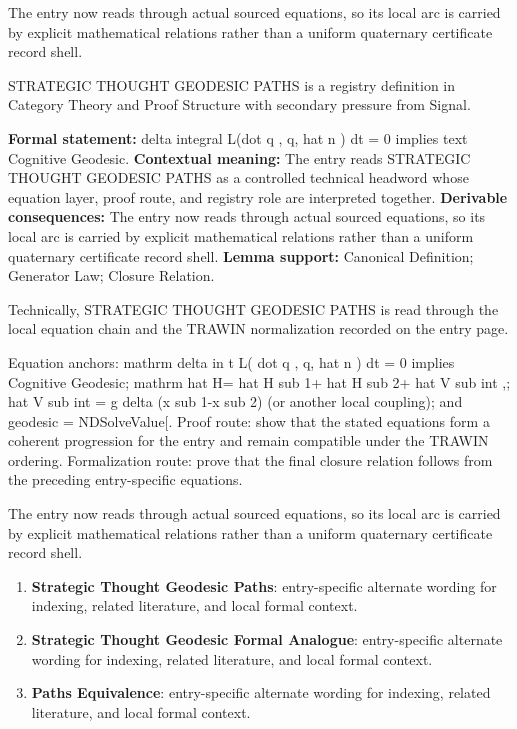The entry now reads through actual sourced equations, so its local arc is carried by explicit mathematical relations rather than a uniform quaternary certificate record shell.
\clearpage


\begingroup\small
{}
STRATEGIC THOUGHT GEODESIC PATHS is a registry definition in Category Theory and Proof Structure with secondary pressure from Signal.

\begingroup\footnotesize\setlength{\emergencystretch}{3em}\sloppy
\textbf{Formal statement:} delta integral L(dot q , q, hat n ) dt = 0 implies text Cognitive Geodesic. \textbf{Contextual meaning:} The entry reads STRATEGIC THOUGHT GEODESIC PATHS as a controlled technical headword whose equation layer, proof route, and registry role are interpreted together. \textbf{Derivable consequences:} The entry now reads through actual sourced equations, so its local arc is carried by explicit mathematical relations rather than a uniform quaternary certificate record shell. \textbf{Lemma support:} Canonical Definition; Generator Law; Closure Relation.\par
\endgroup

Technically, STRATEGIC THOUGHT GEODESIC PATHS is read through the local equation chain and the TRAWIN normalization recorded on the entry page.

Equation anchors: mathrm delta in t L( dot q , q, hat n ) dt = 0 implies Cognitive Geodesic; mathrm hat H= hat H sub 1+ hat H sub 2+ hat V sub int ,; hat V sub int = g delta (x sub 1-x sub 2) (or another local coupling); and geodesic = NDSolveValue[. Proof route: show that the stated equations form a coherent progression for the entry and remain compatible under the TRAWIN ordering. Formalization route: prove that the final closure relation follows from the preceding entry-specific equations.

The entry now reads through actual sourced equations, so its local arc is carried by explicit mathematical relations rather than a uniform quaternary certificate record shell.
\endgroup

\begin{enumerate}[leftmargin=1.6em,itemsep=6pt,topsep=4pt]
\item \textbf{Strategic Thought Geodesic Paths}: entry-specific alternate wording for indexing, related literature, and local formal context.
\item \textbf{Strategic Thought Geodesic Formal Analogue}: entry-specific alternate wording for indexing, related literature, and local formal context.
\item \textbf{Paths Equivalence}: entry-specific alternate wording for indexing, related literature, and local formal context.
\end{enumerate}

